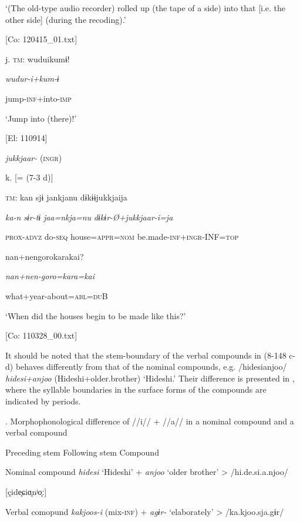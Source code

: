       ‘(The old-type audio recorder) rolled up (the tape of a side) into that [i.e. the other side] (during the recoding).’

      [Co: 120415\_01.txt]

  j.  \textsc{tm}:  wuduikumɨ!

      \textit{wudur-i+kum{}-ɨ}

      jump-\textsc{inf}+into-\textsc{imp}

      ‘Jump into (there)!’

      [El: 110914]

  \textit{jukkjaar-} (\textsc{ingr})

  k.  [= (7-3 d)]

    \textsc{tm}:  kan  sjɨ  jankjanu  dɨkɨɨjukkjaija

      \textit{ka-n}  \textit{sɨr-tɨ}  \textit{jaa=nkja=nu}  \textit{dɨkɨr-Ø+jukkjaar{}-i=ja}

      \textsc{prox}-\textsc{advz}  do-\textsc{seq}  house=\textsc{appr}=\textsc{nom}  be.made-\textsc{inf}+\textsc{ingr}-INF=\textsc{top}

      {\textbar}nan+nengoro{\textbar}karakai?

      \textit{nan+nen-goro=kara=kai}

      what+year-about=\textsc{abl}=\textsc{du}B

      ‘When did the houses begin to be made like this?’

      [Co: 110328\_00.txt]

It should be noted that the stem-boundary of the verbal compounds in (8-148 c-d) behaves differently from that of the nominal compounds, e.g. /hidesianjoo/ \textit{hidesi+anjoo} (Hideshi+older.brother) ‘Hideshi.’ Their difference is presented in , where the syllable boundaries in the surface forms of the compounds are indicated by periods.

\begin{styleBeschriftung}
\textmd{}\textmd{. Morphophonological difference of //i// + //a// in a nominal compound and a verbal compound}
\end{styleBeschriftung}

  Preceding stem    Following stem    Compound

Nominal compound  \textit{hidesi}  ‘Hideshi’  +  \textit{anjoo}  ‘older brother’  >  /hi.de.si.a.njoo/

[çide̞ɕiɑ̞nʲo̞ː]

Verbal comopund  \textit{kakjoos-i}  (mix-\textsc{inf})  +  \textit{agɨr-}  ‘elaborately’  >  /ka.kjoo.sja.gɨr/

